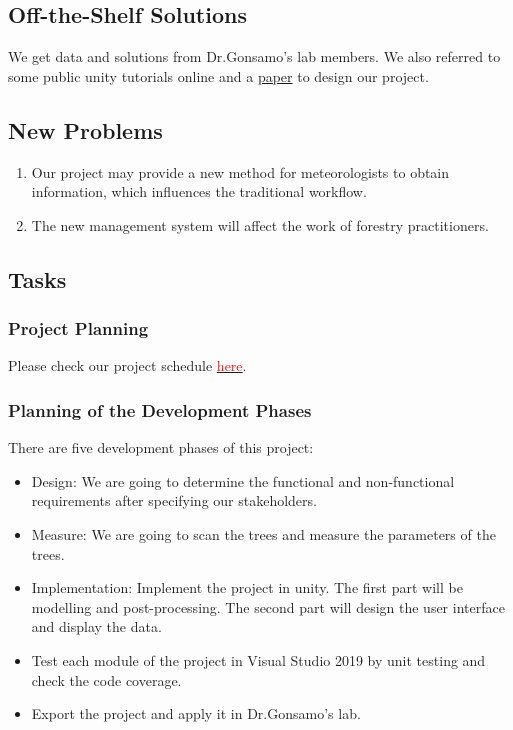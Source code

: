 \documentclass{article}
\begin{document}
\subsection{Off-the-Shelf Solutions}
We get data and solutions from Dr.Gonsamo's lab members.
We also referred to some public unity tutorials online and a \href{https://reader.elsevier.com/reader/sd/pii/S1569843222001881?token=0FD852C628FAE19CABA5E197E8D7ACFF3F2161E405D1A2EC950EE68C39EE00A59ACE7E27C22E4B86F3E04611242D7160&originRegion=us-east-1&originCreation=20220925224650}{paper}  to design our project. 
\subsection{New Problems}
\begin{enumerate}
    \item Our project may provide a new method for meteorologists to obtain information, which influences the traditional workflow. 
    \item The new management system will affect the work of forestry practitioners.
    
\end{enumerate}
\subsection{Tasks}
\subsubsection{Project Planning}
Please check our project schedule \href{https://github.com/wuj187/DigitalTwinCAS/tree/main/docs/DevelopmentPlan/Project_Schedule}{\textcolor{red}{here}}.
\subsubsection{Planning of the Development Phases}
There are five development phases of this project:
\begin{itemize}
    \item Design: We are going to determine the functional and non-functional requirements after specifying our stakeholders.
    \item Measure: We are going to scan the trees and measure the parameters of the trees.
    \item Implementation: Implement the project in unity. The first part will be modelling and post-processing. The second part will design the user interface and display the data.
    \item Test each module of the project in Visual Studio 2019 by unit testing and check the code coverage.
    \item Export the project and apply it in Dr.Gonsamo's lab.
\end{itemize}
\end{document}

